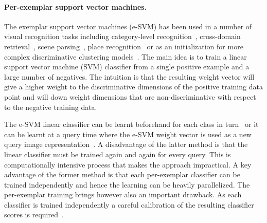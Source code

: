     

\paragraph{Per-exemplar support vector machines.} 
  The exemplar support vector machines (e-SVM) has been used in a number of visual recognition tasks including category-level recognition~\cite{Malisiewicz11}, cross-domain retrieval~\cite{Shrivastava11}, scene parsing~\cite{Tighe13}, place recognition~\cite{Gronat13} or as an initialization  for more complex discriminative clustering models~\cite{Doersch12,Singh12}. The main idea is to train a linear support vector machine (SVM) classifier from a single positive example and a large number of negatives. The intuition is that the resulting weight vector will give a higher weight to the discriminative dimensions of the positive training data point and will down weight dimensions that are non-discriminative with respect to the negative training data. 
  
  \textcolor{petr}{
    The e-SVM linear classifier can be learnt beforehand for each class in turn~\cite{Malisiewicz11} or it can be learnt at a query time where the e-SVM weight vector is used as a new query image representation~\cite{Shrivastava11}. A disadvantage of the latter method is that the linear classifier must be trained again and again for every query. This is computationally intensive process that makes the approach impractical. 
    A key advantage of the former method is that each per-exemplar classifier can be trained independently and hence the learning can be heavily parallelized. The per-exemplar training brings however also an important drawback. As each classifier is trained independently a careful calibration of the resulting classifier scores is required~\cite{Malisiewicz11}. 
  }

